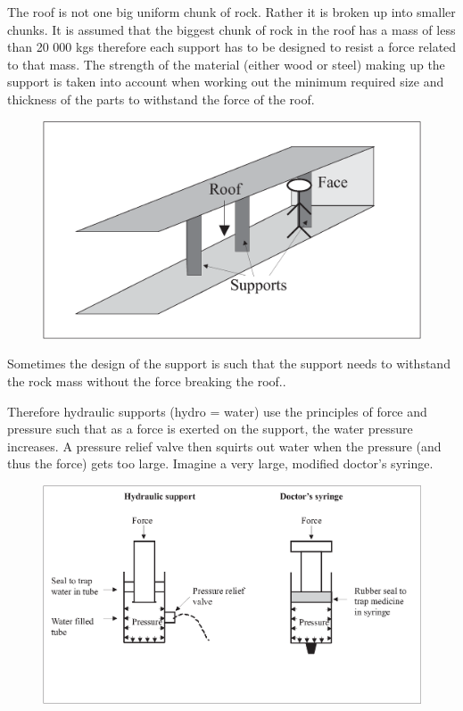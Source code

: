 The roof is not one big uniform chunk of rock. Rather it is broken
up into smaller chunks. It is assumed that the biggest chunk of rock
in the roof has a mass of less than 20 000 kgs therefore each
support has to be designed to resist a force related to that mass.
The strength of the material (either wood or steel) making up the
support is taken into account when working out the minimum required
size and thickness of the parts to withstand the force of the roof.

\begin{figure}[H]
\centering
\includegraphics[scale=0.4]{../../epsimages/EssayPressure2.eps}
\end{figure}


Sometimes the design of the support is such that the support needs
to withstand the rock mass without the force breaking the roof..

Therefore hydraulic supports (hydro = water) use the principles of
force and pressure such that as a force is exerted on the support,
the water pressure increases. A pressure relief valve then squirts
out water when the pressure (and thus the force) gets too large.
Imagine a very large, modified doctor's syringe.
\begin{figure}[H]
\centering
\includegraphics[scale=0.4]{../../epsimages/EssayPressure3.eps}
\end{figure}

